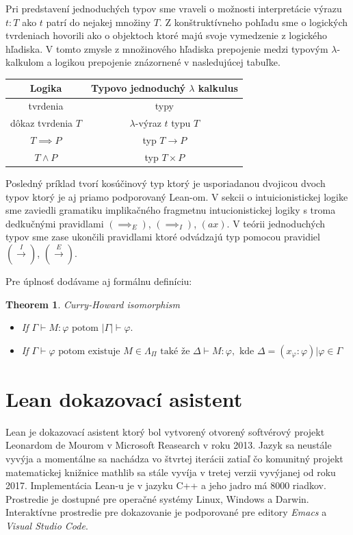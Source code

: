 \documentclass[a4paper,10pt,oneside]{report}%
\newtheorem{theorem}{Theorem}
\begin{document}
    Pri predstavení jednoduchých typov sme vraveli o možnosti interpretácie výrazu
$t : T$ ako $t$ patrí do nejakej množiny $T$.
    Z konštruktívneho pohľadu sme o logických tvrdeniach hovorili ako o objektoch
ktoré majú svoje vymedzenie z logického hľadiska.
    V tomto zmysle z množinového hľadiska prepojenie medzi typovým $\lambda$-kalkulom
a logikou prepojenie znázornené v nasledujúcej tabuľke.
\begin{center}
    \begin{tabular}{ c c }
        Logika &                Typovo jednoduchý $\lambda$ kalkulus \\
        \hline
        tvrdenia                & typy \\
        dôkaz tvrdenia $T$      & $\lambda$-výraz $t$ typu $T$ \\
        $T \implies P$          & typ $T \to P$ \\
        $T \wedge P$            & typ $T \times P$
    \end{tabular}
\end{center}
    Posledný príklad tvorí kosúčinový typ ktorý je usporiadanou dvojicou dvoch typov
ktorý je aj priamo podporovaný Lean-om.
    V sekcii o intuicionistickej logike sme zaviedli gramatiku implikačného fragmetnu
intucionistickej logiky s troma dedkučnými pravidlami $(\implies_{E})$,
    $(\implies_{I})$, $(ax)$.
    V teórii jednoduchých typov sme zase ukončili pravidlami ktoré odvádzajú
typ pomocou pravidiel $(\overset{I}{\rightarrow})$, $(\overset{E}{\rightarrow})$.



    Pre úplnosť dodávame aj formálnu definíciu:

\begin{theorem}{Curry-Howard isomorphism}
    \begin{itemize}
        \item If $\Gamma \vdash M : \varphi \textrm{ potom } |\Gamma|  \vdash \varphi.$
        \item If $\Gamma \vdash \varphi \textrm{ potom existuje } M \in \Lambda_{\Pi}
            \textrm{ také že } \Delta \vdash M : \varphi, \textrm{ kde }
            \Delta = { ( x_{\varphi} : \varphi ) | \varphi \in \Gamma }$
    \end{itemize}
\end{theorem}

    

\chapter{Lean dokazovací asistent}
    Lean je dokazovací asistent ktorý bol vytvorený otvorený softvérový projekt
Leonardom de Mourom v Microsoft Reasearch v roku 2013.
    Jazyk sa neustále vyvýja a momentálne sa nachádza vo štvrtej iterácii \cite{lean4} zatiaľ čo komunitný projekt matematickej knižnice mathlib sa stále vyvíja v tretej verzii\cite{lean3} vyvýjanej od roku 2017.
    Implementácia Lean-u je v jazyku C++ a jeho jadro má 8000 riadkov.
    Prostredie je dostupné pre operačné systémy Linux, Windows a Darwin.
    Interaktívne prostredie pre dokazovanie je podporované pre editory \emph{Emacs} a \emph{Visual Studio Code}.
\end{document}
